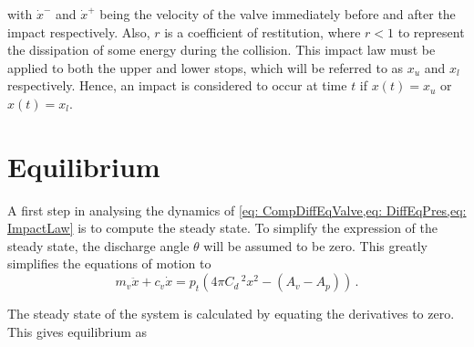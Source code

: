 with $\dot{x}^-$ and $\dot{x}^+$ being the velocity of the valve immediately before and after the impact respectively. Also, $r$ is a coefficient of restitution, where $r < 1$ to represent the dissipation of some energy during the collision. This impact law must be applied to both the upper and lower stops, which will be referred to as $x_u$ and $x_l$ respectively. Hence, an impact is considered to occur at time $t$ if $x(t) = x_u$ or $x(t) = x_l$.

\section{Equilibrium}





A first step in analysing the dynamics of \cref{eq: CompDiffEqValve,eq: DiffEqPres,eq: ImpactLaw} is to compute the steady state. To simplify the expression of the steady state, the discharge angle $\theta$ will be assumed to be zero. This greatly simplifies the equations of motion to
~
\begin{equation} \label{eq: ClosingDiffEqFull}
    m_v \ddot{x} + c_v \dot{x} = p_t \left(
    4 \pi C_d \,^2 x^2
    - \left( A_v - A_p \right)
    \right) \, .
\end{equation}

The steady state of the system is calculated by equating the derivatives to zero. This gives equilibrium as

